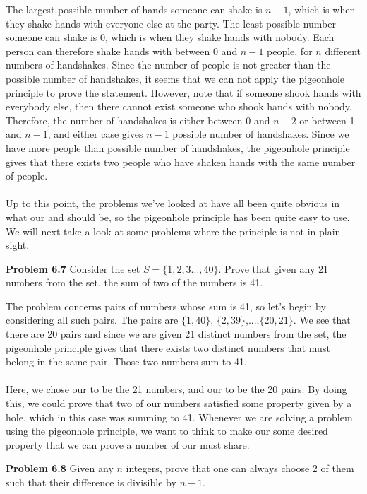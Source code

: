 \documentclass[11pt]{scrartcl}
\DeclarePairedDelimiter
\begin{document}
\noindent
The largest possible number of hands someone can shake is $n-1$, which is when they shake hands with everyone else at the party. The least possible number someone can shake is 0, which is when they shake hands with nobody. Each person can therefore shake hands with between 0 and $n-1$ people, for $n$ different numbers of handshakes. Since the number of people is not greater than the possible number of handshakes, it seems that we can not apply the pigeonhole principle to prove the statement. However, note that if someone shook hands with everybody else, then there cannot exist someone who shook hands with nobody. Therefore, the number of handshakes is either between 0 and $n-2$ or between 1 and $n-1$, and either case gives $n-1$ possible number of handshakes. Since we have more people than possible number of handshakes, the pigeonhole principle gives that there exists two people who have shaken hands with the same number of people. \\
\\
\noindent 
Up to this point, the problems we've looked at have all been quite obvious in what our  and  should be, so the pigeonhole principle has been quite easy to use. We will next take a look at some problems where the principle is not in plain sight. 
\\
\begin{tcolorbox}
\textbf{Problem 6.7} Consider the set $S=\{1,2,3...,40\}$. Prove that given any 21 numbers from the set, the sum of two of the numbers is 41. 
\end{tcolorbox}
\noindent
The problem concerns pairs of numbers whose sum is 41, so let's begin by considering all such pairs. The pairs are $\{1,40\}$, $\{2,39\}$,...,$\{20,21\}$. We see that there are 20 pairs and since we are given 21 distinct numbers from the set, the pigeonhole principle gives that there exists two distinct numbers that must belong in the same pair. Those two numbers sum to 41.  \\
\\
\noindent 
Here, we chose our  to be the 21 numbers, and our  to be the 20 pairs. By doing this, we could prove that two of our numbers satisfied some property given by a hole, which in this case was summing to 41. Whenever we are solving a problem using the pigeonhole principle, we want to think to make our  some desired property that we can prove a  number of our  must share. 
\\
\begin{tcolorbox}
\textbf{Problem 6.8} Given any $n$ integers, prove that one can always choose 2 of them such that their difference is divisible by $n-1$.  
\end{tcolorbox}
\end{document}
